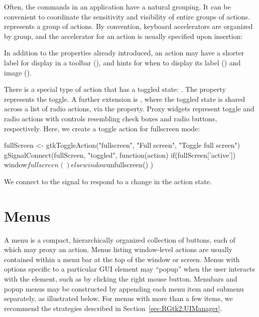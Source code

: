 Often, the commands in an application have a natural grouping. It can
be convenient to coordinate the sensitivity and visibility of entire
groups of actions.  represents a group of
actions. By convention, keyboard accelerators are organized by group,
and the accelerator for an action is usually specified upon insertion:
\begin{Schunk}
\end{Schunk}

In addition to the properties already introduced, an action may have a
shorter label for display in a toolbar (), and
hints for when to display its label () and image
().

There is a special type of action that has a toggled state:
. The  property represents the
toggle. A further extension is , where the
toggled state is shared across a list of radio actions, via the
 property. Proxy widgets represent toggle and radio
actions with controls resembling check boxes and radio buttons,
respectively. Here, we create a toggle action for fullscreen mode:
\begin{Schunk}
\begin{Sinput}
 fullScreen <- gtkToggleAction("fullscreen", "Full screen", "Toggle full screen")
 gSignalConnect(fullScreen, "toggled", function(action) {
   if(fullScreen['active'])
     window$fullscreen()
   else
     window$unfullscreen()
 })
\end{Sinput}
\end{Schunk}
%
We connect to the  signal to respond to a change in the
action state.


\section{Menus}
\label{sec:RGtk2:menus}

A menu is a compact, hierarchically organized collection of buttons,
each of which may proxy an action. Menus listing window-level actions
are usually contained within a menu bar at the top of the window or
screen. Menus with options specific to a particular GUI element may
``popup'' when the user interacts with the element, such as by
clicking the right mouse button. Menubars and popup menus may be
constructed by appending each menu item and submenu separately, as
illustrated below. For menus with more than a few items, we recommend
the strategies described in Section~\ref{sec:RGtk2:UIManager}.

